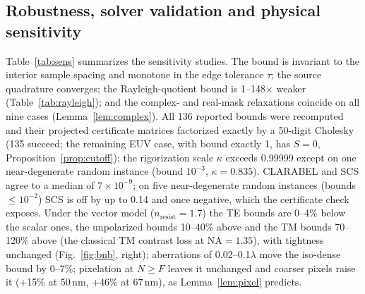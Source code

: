 \documentclass[11pt,a4paper]{article}
\newcommand{\SI}[2]{\ensuremath{#1\,\mathrm{#2}}}\newcommand{\SIrange}[3]{\ensuremath{#1\text{--}#2\,\mathrm{#3}}}
\newcommand{\NA}{\mathrm{NA}}
\begin{document}
\subsection{Robustness, solver validation and physical sensitivity}\label{sec:robust}
Table~\ref{tab:sens} summarizes the sensitivity studies. The bound is invariant to the interior sample spacing and monotone in the edge tolerance $\tau$; the source quadrature converges; the Rayleigh-quotient bound is 1--148$\times$ weaker (Table~\ref{tab:rayleigh}); and the complex- and real-mask relaxations coincide on all nine cases (Lemma~\ref{lem:complex}). All 136 reported bounds were recomputed and their projected certificate matrices factorized exactly by a 50-digit Cholesky (135 succeed; the remaining EUV case, with bound exactly 1, has $S=0$, Proposition~\ref{prop:cutoff}); the rigorization scale $\kappa$ exceeds 0.99999 except on one near-degenerate random instance (bound $10^{-3}$, $\kappa=0.835$). CLARABEL and SCS agree to a median of $7\times10^{-9}$; on five near-degenerate random instances (bounds $\le10^{-2}$) SCS is off by up to 0.14 and once negative, which the certificate check exposes. Under the vector model ($n_{\mathrm{resist}}=1.7$) the TE bounds are 0--4\% below the scalar ones, the unpolarized bounds 10--40\% above and the TM bounds 70--120\% above (the classical TM contrast loss at $\NA=1.35$), with tightness unchanged (Fig.~\ref{fig:bnb}, right); aberrations of 0.02--0.1$\lambda$ move the iso-dense bound by 0--7\%; pixelation at $N\ge F$ leaves it unchanged and coarser pixels raise it (+15\% at \SI{50}{nm}, +46\% at \SI{67}{nm}), as Lemma~\ref{lem:pixel} predicts.
\end{document}
